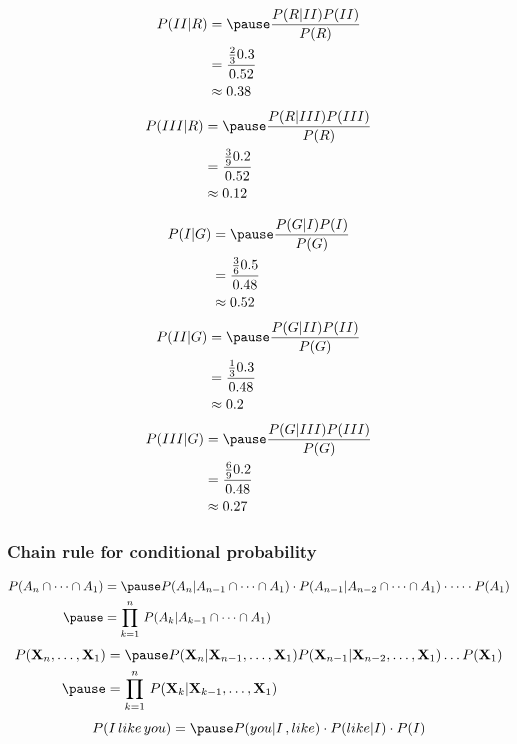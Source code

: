 \documentclass[12pt,aspectratio=169]{beamer}
\begin{document}
\begin{frame}
\[
\begin{aligned}
P(II|R)&=\pause \frac{P(R|II)P(II)}{P(R)}\\
&=\frac{\frac{2}{3}0.3}{0.52}\\
& \approx 0.38
\end{aligned}
\]
\[
\begin{aligned}
P(III|R)&=\pause \frac{P(R|III)P(III)}{P(R)}\\
&=\frac{\frac{3}{9}0.2}{0.52}\\
& \approx 0.12
\end{aligned}
\]
\end{frame}


\begin{frame}
\[
\begin{aligned}
P(I|G)&=\pause \frac{P(G|I)P(I)}{P(G)}\\
&=\frac{\frac{3}{6}0.5}{0.48}\\
& \approx 0.52
\end{aligned}
\]
\[
\begin{aligned}
P(II|G)&=\pause \frac{P(G|II)P(II)}{P(G)}\\
&=\frac{\frac{1}{3}0.3}{0.48}\\
& \approx 0.2
\end{aligned}
\]
\[
\begin{aligned}
P(III|G)&=\pause \frac{P(G|III)P(III)}{P(G)}\\
&=\frac{\frac{6}{9}0.2}{0.48}\\
& \approx 0.27
\end{aligned}
\]
\end{frame}


\begin{frame}
\frametitle{Chain rule for conditional probability}
\[
\begin{aligned}
P(A_n\cap \dots \cap A_1)&=\pause P(A_n|A_{n-1}\cap \dots \cap A_1)\cdot P(A_{n-1}|A_{n-2}\cap \dots \cap A_1)\cdot \dots \cdot P(A_1)\\ \pause
&=\prod_{k=1}^n\,P(A_k|A_{k-1}\cap \dots \cap A_1)
\end{aligned}
\]\pause
\[
\begin{aligned}
P(\mathbf{X}_n,\dots,\mathbf{X}_1)&=\pause P(\mathbf{X}_n|\mathbf{X}_{n-1},\dots,\mathbf{X}_1)P(\mathbf{X}_{n-1}|\mathbf{X}_{n-2},\dots,\mathbf{X}_1)\dots P(\mathbf{X}_1)\\ \pause
& = \prod_{k=1}^n\,P(\mathbf{X}_k|\mathbf{X}_{k-1},\dots,\mathbf{X}_1)
\end{aligned}
\]\pause
\[
P(I\,like\,you)=\pause P(you|I\,,like)\cdot P(like|I)\cdot P(I)
\]
\end{frame}
\end{document}
